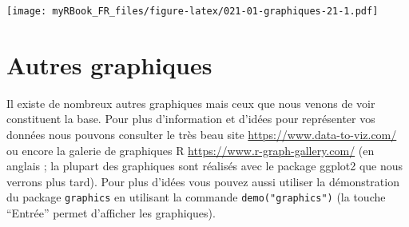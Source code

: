 \documentclass[
]{book}
\newenvironment{Shaded}{\begin{snugshade}}{\end{snugshade}}
\newcommand{\CommentTok}[1]{\textcolor[rgb]{0.56,0.35,0.01}{\textit{#1}}}
\newcommand{\DataTypeTok}[1]{\textcolor[rgb]{0.13,0.29,0.53}{#1}}
\newcommand{\DecValTok}[1]{\textcolor[rgb]{0.00,0.00,0.81}{#1}}
\newcommand{\KeywordTok}[1]{\textcolor[rgb]{0.13,0.29,0.53}{\textbf{#1}}}
\newcommand{\NormalTok}[1]{#1}
\newcommand{\OperatorTok}[1]{\textcolor[rgb]{0.81,0.36,0.00}{\textbf{#1}}}
\newcommand{\OtherTok}[1]{\textcolor[rgb]{0.56,0.35,0.01}{#1}}
\newcommand{\StringTok}[1]{\textcolor[rgb]{0.31,0.60,0.02}{#1}}
\begin{document}
\begin{Shaded}
\end{Shaded}

\texttt{[image: myRBook\_FR\_files/figure-latex/021-01-graphiques-21-1.pdf]}

\hypertarget{autres-graphiques}{%
\section{Autres graphiques}\label{autres-graphiques}}

Il existe de nombreux autres graphiques mais ceux que nous venons de voir constituent la base. Pour plus d'information et d'idées pour représenter vos données nous pouvons consulter le très beau site \url{https://www.data-to-viz.com/} ou encore la galerie de graphiques R \url{https://www.r-graph-gallery.com/} (en anglais ; la plupart des graphiques sont réalisés avec le package ggplot2 que nous verrons plus tard). Pour plus d'idées vous pouvez aussi utiliser la démonstration du package \texttt{graphics} en utilisant la commande \texttt{demo("graphics")} (la touche ``Entrée'' permet d'afficher les graphiques).
\end{document}
